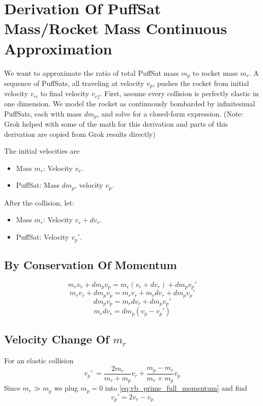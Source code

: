 \documentclass{article}
\begin{document}
\section{Derivation Of PuffSat Mass/Rocket Mass Continuous Approximation}\label{sec:PuffSat_ratio_approximation} We want to approximate the ratio of total PuffSat mass \(m_p\) to rocket mass \(m_r\). A sequence of PuffSats, all traveling at velocity \(v_p\), pushes the rocket from initial velocity \(v_{ri}\) to final velocity \(v_{rf}\). First, assume every collision is perfectly elastic in one dimension. We model the rocket as continuously bombarded by infinitesimal PuffSats, each with mass \(dm_p\), and solve for a closed-form expression. (Note: Grok \cite{grok} helped with some of the math for this derivation and parts of this derivation are copied from Grok results directly)

The initial velocities are
\begin{itemize}
\item Mass \( m_r \): Velocity \( v_r \).
\item PuffSat: Mass \( dm_p \), velocity \( v_p \).
\end{itemize}
After the collision, let:
\begin{itemize}
    \item Mass \( m_r \): Velocity \( v_r + dv_r \).
    \item PuffSat: Velocity \( v_p' \).
\end{itemize}
\subsection{By Conservation Of Momentum} \[
m_r v_r + dm_p v_p = m_r (v_r + dv_r) + dm_p v_p'
\]
\[
m_r v_r + dm_p v_p = m_r v_r + m_r dv_r + dm_p v_p'
\]
\[
dm_p v_p = m_r dv_r + dm_p v_p'
\]
\begin{equation}
m_r dv_r = dm_p (v_p - v_p') \label{eq:momentum}
\end{equation}

\subsection[Velocity Change Of Rocket Mass]{Velocity Change Of \(m_r\)}
For an elastic collision
\begin{equation}
    v_p'\ = \frac{2m_r}{m_r+m_p}v_r + \frac{m_p-m_r}{m_r+m_p}v_p \label{eq:vb_prime_full_momentum}
\end{equation}
Since \(m_r \gg m_p\) we plug \(m_p = 0\) into \autoref{eq:vb_prime_full_momentum} and find 
\begin{equation}
v_p' = 2v_r - v_p \label{eq:vb_prime_result}
\end{equation} 
\end{document}
